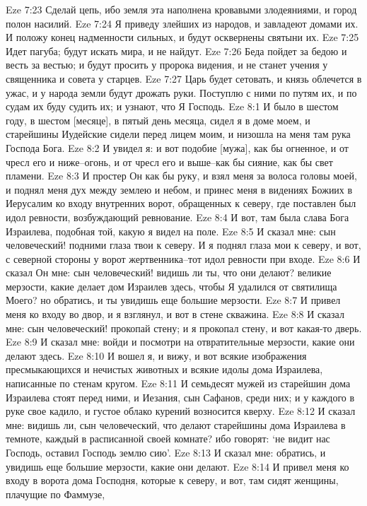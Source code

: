Eze 7:23  Сделай цепь, ибо земля эта наполнена кровавыми злодеяниями, и город полон насилий.
Eze 7:24  Я приведу злейших из народов, и завладеют домами их. И положу конец надменности сильных, и будут осквернены святыни их.
Eze 7:25  Идет пагуба; будут искать мира, и не найдут.
Eze 7:26  Беда пойдет за бедою и весть за вестью; и будут просить у пророка видения, и не станет учения у священника и совета у старцев.
Eze 7:27  Царь будет сетовать, и князь облечется в ужас, и у народа земли будут дрожать руки. Поступлю с ними по путям их, и по судам их буду судить их; и узнают, что Я Господь.
Eze 8:1  И было в шестом году, в шестом [месяце], в пятый день месяца, сидел я в доме моем, и старейшины Иудейские сидели перед лицем моим, и низошла на меня там рука Господа Бога.
Eze 8:2  И увидел я: и вот подобие [мужа], как бы огненное, и от чресл его и ниже--огонь, и от чресл его и выше--как бы сияние, как бы свет пламени.
Eze 8:3  И простер Он как бы руку, и взял меня за волоса головы моей, и поднял меня дух между землею и небом, и принес меня в видениях Божиих в Иерусалим ко входу внутренних ворот, обращенных к северу, где поставлен был идол ревности, возбуждающий ревнование.
Eze 8:4  И вот, там была слава Бога Израилева, подобная той, какую я видел на поле.
Eze 8:5  И сказал мне: сын человеческий! подними глаза твои к северу. И я поднял глаза мои к северу, и вот, с северной стороны у ворот жертвенника--тот идол ревности при входе.
Eze 8:6  И сказал Он мне: сын человеческий! видишь ли ты, что они делают? великие мерзости, какие делает дом Израилев здесь, чтобы Я удалился от святилища Моего? но обратись, и ты увидишь еще большие мерзости.
Eze 8:7  И привел меня ко входу во двор, и я взглянул, и вот в стене скважина.
Eze 8:8  И сказал мне: сын человеческий! прокопай стену; и я прокопал стену, и вот какая-то дверь.
Eze 8:9  И сказал мне: войди и посмотри на отвратительные мерзости, какие они делают здесь.
Eze 8:10  И вошел я, и вижу, и вот всякие изображения пресмыкающихся и нечистых животных и всякие идолы дома Израилева, написанные по стенам кругом.
Eze 8:11  И семьдесят мужей из старейшин дома Израилева стоят перед ними, и Иезания, сын Сафанов, среди них; и у каждого в руке свое кадило, и густое облако курений возносится кверху.
Eze 8:12  И сказал мне: видишь ли, сын человеческий, что делают старейшины дома Израилева в темноте, каждый в расписанной своей комнате? ибо говорят: `не видит нас Господь, оставил Господь землю сию'.
Eze 8:13  И сказал мне: обратись, и увидишь еще большие мерзости, какие они делают.
Eze 8:14  И привел меня ко входу в ворота дома Господня, которые к северу, и вот, там сидят женщины, плачущие по Фаммузе,
